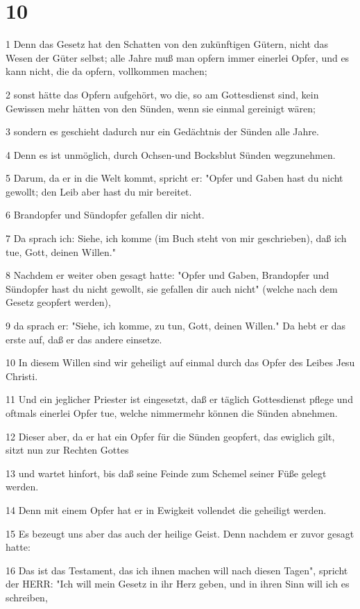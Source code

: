 \chapter{10}

\par 1 Denn das Gesetz hat den Schatten von den zukünftigen Gütern, nicht das Wesen der Güter selbst; alle Jahre muß man opfern immer einerlei Opfer, und es kann nicht, die da opfern, vollkommen machen;
\par 2 sonst hätte das Opfern aufgehört, wo die, so am Gottesdienst sind, kein Gewissen mehr hätten von den Sünden, wenn sie einmal gereinigt wären;
\par 3 sondern es geschieht dadurch nur ein Gedächtnis der Sünden alle Jahre.
\par 4 Denn es ist unmöglich, durch Ochsen-und Bocksblut Sünden wegzunehmen.
\par 5 Darum, da er in die Welt kommt, spricht er: "Opfer und Gaben hast du nicht gewollt; den Leib aber hast du mir bereitet.
\par 6 Brandopfer und Sündopfer gefallen dir nicht.
\par 7 Da sprach ich: Siehe, ich komme (im Buch steht von mir geschrieben), daß ich tue, Gott, deinen Willen."
\par 8 Nachdem er weiter oben gesagt hatte: "Opfer und Gaben, Brandopfer und Sündopfer hast du nicht gewollt, sie gefallen dir auch nicht" (welche nach dem Gesetz geopfert werden),
\par 9 da sprach er: "Siehe, ich komme, zu tun, Gott, deinen Willen." Da hebt er das erste auf, daß er das andere einsetze.
\par 10 In diesem Willen sind wir geheiligt auf einmal durch das Opfer des Leibes Jesu Christi.
\par 11 Und ein jeglicher Priester ist eingesetzt, daß er täglich Gottesdienst pflege und oftmals einerlei Opfer tue, welche nimmermehr können die Sünden abnehmen.
\par 12 Dieser aber, da er hat ein Opfer für die Sünden geopfert, das ewiglich gilt, sitzt nun zur Rechten Gottes
\par 13 und wartet hinfort, bis daß seine Feinde zum Schemel seiner Füße gelegt werden.
\par 14 Denn mit einem Opfer hat er in Ewigkeit vollendet die geheiligt werden.
\par 15 Es bezeugt uns aber das auch der heilige Geist. Denn nachdem er zuvor gesagt hatte:
\par 16 Das ist das Testament, das ich ihnen machen will nach diesen Tagen", spricht der HERR: "Ich will mein Gesetz in ihr Herz geben, und in ihren Sinn will ich es schreiben,
